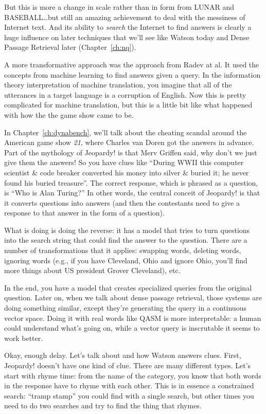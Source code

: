 But this is more a change in scale rather than in form from LUNAR and
BASEBALL\dots but still an amazing achievement to deal with the
messiness of Internet text.  And its ability to \emph{search} the
Internet to find answers is clearly a huge influence on later
techniques that we’ll see like Watson today and Dense Passage
Retrieval later (Chapter~\ref{ch:nq}).

A more transformative approach was the  approach from Radev
at al.  It used the concepts from machine learning to find answers
given a query.  In the information theory interpretation of machine
translation, you imagine that all of the utterances in a target
language is a corruption of English.  Now this is pretty complicated
for machine translation, but this is a little bit like what happened
with how the the game show \jeopardy{} came to be.

In Chapter~\ref{ch:dynabench}, we'll talk about the cheating scandal
around the American game show \textit{21}, where Charles van Doren got
the answers in advance.
%
Part of the mythology of Jeopardy! is that Merv Griffen said, why
don’t we just give them the answers!
%
So you have clues like “During
WWII this computer scientist \& code breaker converted his money into
silver \& buried it; he never found his buried treasure”.  The correct
response, which is phrased as a question, is “Who is Alan Turing?”
%
In other words, the central conceit of Jeopardy! is that it converts questions into answers (and then the contestants need to give a response to that answer in the form of a question).

What  is doing is doing the reverse: it has a model that
tries to turn questions into the search string that could find the
answer to the question.
%
There are a number of transformations that it applies: swapping words, deleting words, ignoring words (e.g., if you have Cleveland, Ohio and ignore Ohio, you’ll find more things about US president Grover Cleveland), etc.

In the end, you have a model that creates specialized queries from the
original question.
%
Later on, when we talk about dense passage
retrieval, those systems are doing something similar, except they’re
generating the query in a continuous vector space.
%
Doing it with real
words like QASM is more interpretable: a human could understand what’s
going on, while a vector query is inscrutable it seems to work better.

Okay, enough delay.  Let’s talk about \jeopardy{} and how Watson
answers \jeopardy{} clues.  First, Jeopardy! doesn’t have one kind of
clue.  There are many different types.  Let’s start with rhyme time:
from the name of the category, you know that both words in the
response have to rhyme with each other.
%
This is in essence a
constrained search: ``tramp stamp'' you could find with a single search,
but other times you need to do two searches and try to find the thing
that rhymes.

